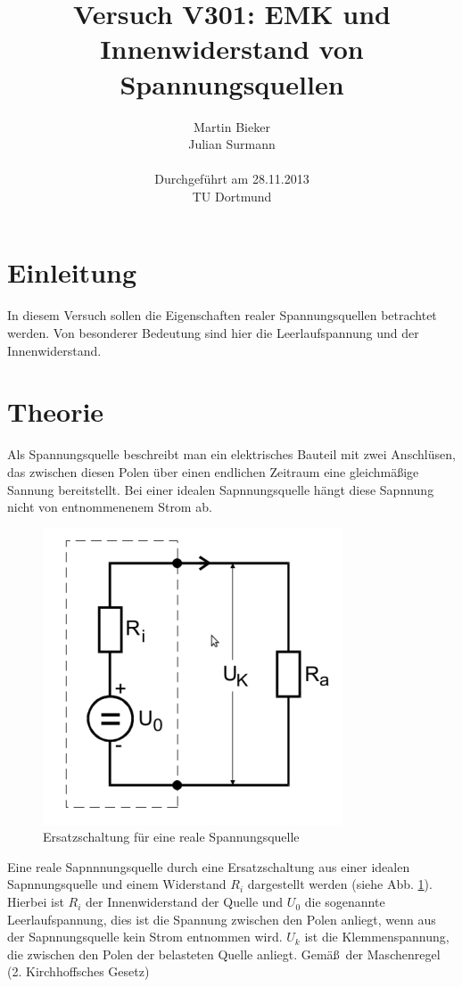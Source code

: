 \documentclass[11pt]{article}
\title{\textbf{Versuch V301: EMK und Innenwiderstand von Spannungsquellen}}
\author{Martin Bieker\\
		Julian Surmann\\
		\\
		Durchgef\"{u}hrt am 28.11.2013\\
		TU Dortmund}
\date{}
\begin{document}
\renewcommand\tablename{Tabelle}
\renewcommand\figurename{Abbildung}
\maketitle
\thispagestyle{empty}
\newpage
\clearpage
\setcounter{page}{1}

\section{Einleitung}
In diesem Versuch sollen die Eigenschaften realer Spannungsquellen betrachtet werden. Von besonderer Bedeutung sind hier die Leerlaufspannung und der Innenwiderstand.
\section{Theorie}
Als Spannungsquelle beschreibt man ein elektrisches Bauteil mit zwei Anschl\"usen, das zwischen diesen Polen \"uber einen endlichen Zeitraum eine gleichm\"a\ss ige Sannung bereitstellt. Bei einer idealen Sapnnungsquelle h\"angt diese Sapnnung nicht von entnommenenem Strom ab.
\begin{figure}[htp]
\centering
\includegraphics[scale=1.00]{abb3.png}
\caption{Ersatzschaltung f\"ur eine reale Spannungsquelle}
\label{Ersatz}
\end{figure}
Eine reale Sapnnnungsquelle durch eine Ersatzschaltung aus einer idealen Sapnnungsquelle und einem Widerstand $R_i$ dargestellt werden (siehe Abb. \ref{Ersatz}). Hierbei ist $R_i$ der Innenwiderstand der Quelle und  $U_0$ die sogenannte Leerlaufspannung, dies ist die Spannung zwischen den Polen anliegt, wenn aus der Sapnnungsquelle kein Strom entnommen wird. $U_k$ ist die Klemmenspannung, die zwischen den Polen der belasteten Quelle anliegt. Gem\"a\ss\ der Maschenregel (2. Kirchhoffsches Gesetz)
\end{document}
